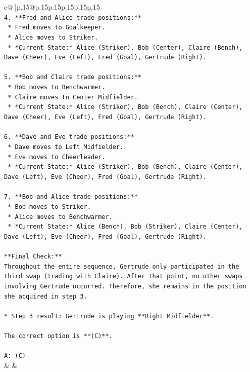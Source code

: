 \documentclass{article}
\begin{document}
{\begin{supertabular}{c@{$\;$}|p{.15\linewidth}@{}p{.15\linewidth}p{.15\linewidth}p{.15\linewidth}p{.15\linewidth}p{.15\linewidth}}
{{{\\ 
\texttt{4.  **Fred and Alice trade positions:**} \\
\texttt{    *   Fred moves to Goalkeeper.} \\
\texttt{    *   Alice moves to Striker.} \\
\texttt{    *   *Current State:* Alice (Striker), Bob (Center), Claire (Bench), Dave (Cheer), Eve (Left), Fred (Goal), Gertrude (Right).} \\
\\ 
\texttt{5.  **Bob and Claire trade positions:**} \\
\texttt{    *   Bob moves to Benchwarmer.} \\
\texttt{    *   Claire moves to Center Midfielder.} \\
\texttt{    *   *Current State:* Alice (Striker), Bob (Bench), Claire (Center), Dave (Cheer), Eve (Left), Fred (Goal), Gertrude (Right).} \\
\\ 
\texttt{6.  **Dave and Eve trade positions:**} \\
\texttt{    *   Dave moves to Left Midfielder.} \\
\texttt{    *   Eve moves to Cheerleader.} \\
\texttt{    *   *Current State:* Alice (Striker), Bob (Bench), Claire (Center), Dave (Left), Eve (Cheer), Fred (Goal), Gertrude (Right).} \\
\\ 
\texttt{7.  **Bob and Alice trade positions:**} \\
\texttt{    *   Bob moves to Striker.} \\
\texttt{    *   Alice moves to Benchwarmer.} \\
\texttt{    *   *Current State:* Alice (Bench), Bob (Striker), Claire (Center), Dave (Left), Eve (Cheer), Fred (Goal), Gertrude (Right).} \\
\\ 
\texttt{**Final Check:**} \\
\texttt{Throughout the entire sequence, Gertrude only participated in the third swap (trading with Claire). After that point, no other swaps involving Gertrude occurred. Therefore, she remains in the position she acquired in step 3.} \\
\\ 
\texttt{*   Step 3 result: Gertrude is playing **Right Midfielder**.} \\
\\ 
\texttt{The correct option is **(C)**.} \\
\\ 
\texttt{A: (C)} \\
            }
        }
    }
    & & \\ \\


\end{supertabular}}
\end{document}
